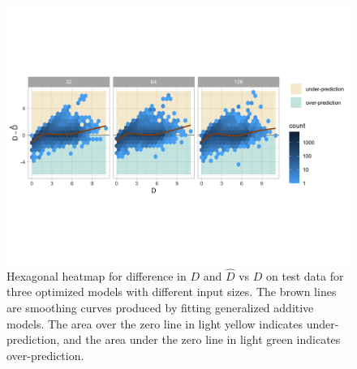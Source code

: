 \documentclass[]{interact}
\theoremstyle{plain}%
\theoremstyle{definition}
\theoremstyle{remark}
\begin{document}
\begin{figure}[!h]

{\centering \includegraphics[width=1\linewidth]{paper_files/figure-latex/model-performance-1} 

}

\caption{Hexagonal heatmap for difference in $D$ and $\hat{D}$ vs $D$ on test data for three optimized models with different input sizes. The brown lines are smoothing curves produced by fitting generalized additive models. The area over the zero line in light yellow indicates under-prediction, and the area under the zero line in light green indicates over-prediction.}\label{fig:model-performance}
\end{figure}
\end{document}
